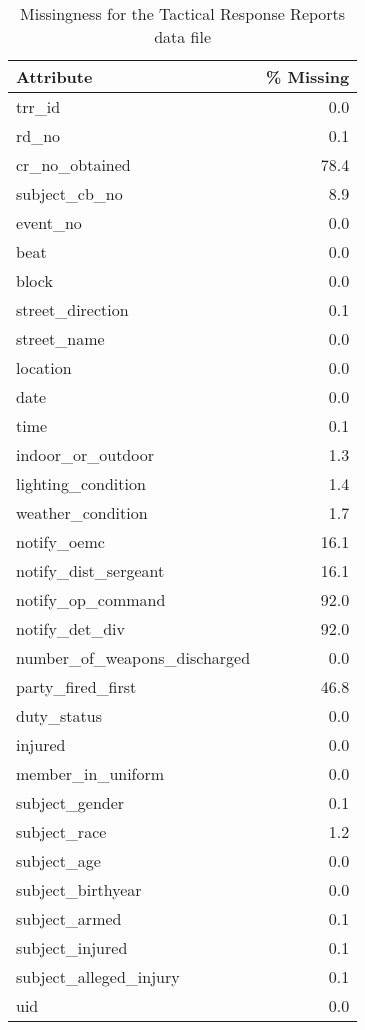 \begin{table}[t!]
\caption{Missingness for the Tactical Response Reports data file}
\centering 
\begin{tabular}{lr}
\toprule
                   Attribute &  \% Missing \\
\midrule
                      trr\_id &        0.0 \\
                       rd\_no &        0.1 \\
              cr\_no\_obtained &       78.4 \\
               subject\_cb\_no &        8.9 \\
                    event\_no &        0.0 \\
                        beat &        0.0 \\
                       block &        0.0 \\
            street\_direction &        0.1 \\
                 street\_name &        0.0 \\
                    location &        0.0 \\
                        date &        0.0 \\
                        time &        0.1 \\
           indoor\_or\_outdoor &        1.3 \\
          lighting\_condition &        1.4 \\
           weather\_condition &        1.7 \\
                 notify\_oemc &       16.1 \\
        notify\_dist\_sergeant &       16.1 \\
           notify\_op\_command &       92.0 \\
              notify\_det\_div &       92.0 \\
number\_of\_weapons\_discharged &        0.0 \\
           party\_fired\_first &       46.8 \\
                 duty\_status &        0.0 \\
                     injured &        0.0 \\
           member\_in\_uniform &        0.0 \\
              subject\_gender &        0.1 \\
                subject\_race &        1.2 \\
                 subject\_age &        0.0 \\
           subject\_birthyear &        0.0 \\
               subject\_armed &        0.1 \\
             subject\_injured &        0.1 \\
      subject\_alleged\_injury &        0.1 \\
                         uid &        0.0 \\
\bottomrule
\end{tabular}
\end{table}


